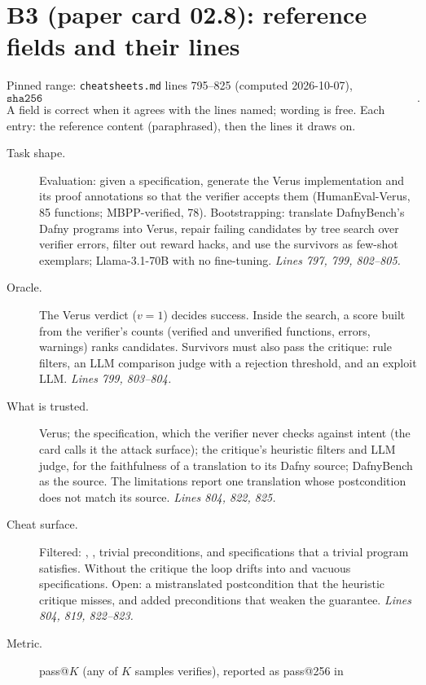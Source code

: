 \documentclass[11pt]{article}
\begin{document}
\section*{B3 (paper card 02.8): reference fields and their lines}

Pinned range: \texttt{cheatsheets.md} lines 795--825 (computed 2026-10-07),
\[ \texttt{sha256 dce0012836edfb635ae4f292d262e2ba5cd3895a1ddb494b7f81bf1980ae7847}. \]
A field is correct when it agrees with the lines named; wording is free. Each
entry: the reference content (paraphrased), then the lines it draws on.

\begin{description}
\item[Task shape.] Evaluation: given a specification, generate the Verus
  implementation and its proof annotations so that the verifier accepts them
  (HumanEval-Verus, 85 functions; MBPP-verified, 78). Bootstrapping: translate
  DafnyBench's Dafny programs into Verus, repair failing candidates by tree
  search over verifier errors, filter out reward hacks, and use the survivors
  as few-shot exemplars; Llama-3.1-70B with no fine-tuning.
  \emph{Lines 797, 799, 802--805.}
\item[Oracle.] The Verus verdict ($v = 1$) decides success. Inside the search,
  a score built from the verifier's counts (verified and unverified functions,
  errors, warnings) ranks candidates. Survivors must also pass the critique:
  rule filters, an LLM comparison judge with a rejection threshold, and an
  exploit LLM. \emph{Lines 799, 803--804.}
\item[What is trusted.] Verus; the specification, which the verifier never
  checks against intent (the card calls it the attack surface); the critique's
  heuristic filters and LLM judge, for the faithfulness of a translation to its
  Dafny source; DafnyBench as the source. The limitations report one
  translation whose postcondition does not match its source.
  \emph{Lines 804, 822, 825.}
\item[Cheat surface.] Filtered: , ,
  trivial preconditions, and specifications that a trivial program satisfies.
  Without the critique the loop drifts into  and vacuous
  specifications. Open: a mistranslated postcondition that the heuristic
  critique misses, and added preconditions that weaken the guarantee.
  \emph{Lines 804, 819, 822--823.}
\item[Metric.] pass@$K$ (any of $K$ samples verifies), reported as pass@256 in

\end{description}
\end{document}

